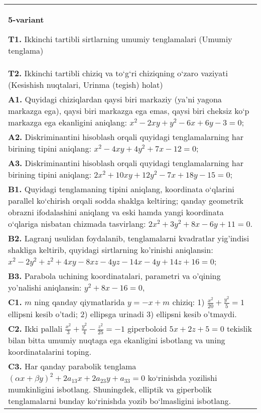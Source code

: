 \documentclass{article}
\begin{document}
\begin{tabular}{m{17cm}}
\textbf{5-variant}
\newline

\textbf{T1.} Ikkinchi tartibli sirtlarning umumiy tenglamalari (Umumiy tenglama) \\
\textbf{T2.} Ikkinchi tartibli chiziq va to‘g‘ri chiziqning o‘zaro vaziyati (Kesishish nuqtalari, Urinma (tegish) holat) \\
\textbf{A1.} Quyidagi chiziqlardan qaysi biri markaziy (ya’ni yagona markazga ega), qaysi biri markazga ega emas, qaysi biri cheksiz ko‘p markazga ega ekanligini aniqlang: $x^2-2 x y+y^2-6 x+6 y-3=0$; \\
\textbf{A2.} Diskriminantini hisoblash orqali quyidagi tenglamalarning har birining tipini aniqlang: $x^2-4 x y+4 y^2+7 x-12=0$; \\
\textbf{A3.} Diskriminantini hisoblash orqali quyidagi tenglamalarning har birining tipini aniqlang: $2 x^2+10 x y+12 y^2-7 x+18 y-15=0$; \\
\textbf{B1.} Quyidagi tenglamaning tipini aniqlang, koordinata o‘qlarini parallel ko‘chirish orqali sodda shaklga keltiring; qanday geometrik obrazni ifodalashini aniqlang va eski hamda yangi koordinata o‘qlariga nisbatan chizmada tasvirlang: $2 x^2+3 y^2+8 x-6 y+11=0$. \\
\textbf{B2.} Lagranj usulidan foydalanib, tenglamalarni kvadratlar yig'indisi shakliga keltirib, quyidagi sirtlarning ko'rinishi aniqlansin: $x^2-2 y^2+z^2+4 x y-8 x z-4 y z-14 x-4 y+14 z+16=0$; \\
\textbf{B3.} Parabola uchining koordinatalari, parametri va o'qining yo'nalishi aniqlansin: $y^2+8 x-16=0$, \\
\textbf{C1.} $m$ ning qanday qiymatlarida $y=-x+m$ chiziq: 1) $\frac{x^2}{20}+\frac{y^2}{5}=1$ ellipsni kesib o'tadi; 2) ellipsga urinadi 3) ellipsni kesib o'tmaydi. \\
\textbf{C2.} Ikki pallali $\frac{x^2}{3}+\frac{y^2}{4}-\frac{z^2}{25}=-1$ giperboloid $5 x+2 z+5=0$ tekislik bilan bitta umumiy nuqtaga ega ekanligini isbotlang va uning koordinatalarini toping. \\
\textbf{C3.} Har qanday parabolik tenglama $ (\alpha x+\beta y) ^2+2a_{13}x+2a_{23}y+a_{33}=0$ ko‘rinishda yozilishi mumkinligini isbotlang. Shuningdek, elliptik va giperbolik tenglamalarni bunday ko‘rinishda yozib bo‘lmasligini isbotlang. \\

\end{tabular}
\vspace{1cm}
\end{document}

